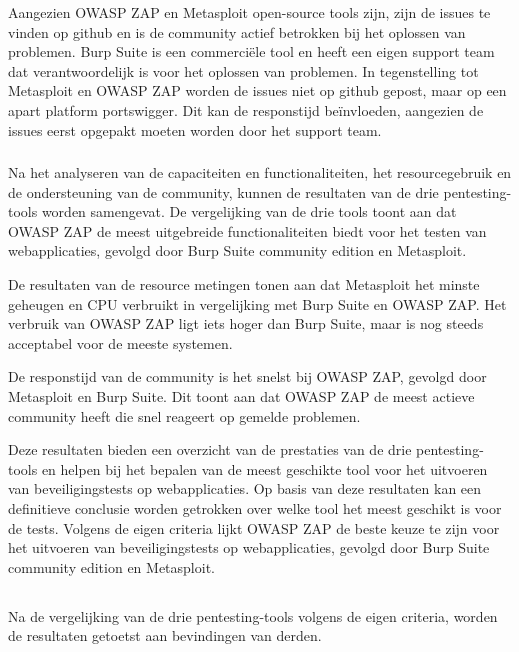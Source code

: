 Aangezien OWASP ZAP en Metasploit open-source tools zijn, zijn de issues te vinden op github en is de community actief
betrokken bij het oplossen van problemen. Burp Suite is een commerciële tool en heeft een eigen support team dat 
verantwoordelijk is voor het oplossen van problemen. In tegenstelling tot Metasploit en OWASP ZAP worden de issues niet 
op github gepost, maar op een apart platform portswigger. Dit kan de responstijd beïnvloeden, 
aangezien de issues eerst opgepakt moeten worden door het support team.

\subsubsection{}
Na het analyseren van de capaciteiten en functionaliteiten, het resourcegebruik en de ondersteuning van de community,
kunnen de resultaten van de drie pentesting-tools worden samengevat. De vergelijking van de drie tools toont aan dat
OWASP ZAP de meest uitgebreide functionaliteiten biedt voor het testen van webapplicaties, gevolgd door Burp Suite 
community edition en Metasploit. 

De resultaten van de resource metingen tonen aan dat Metasploit het minste 
geheugen en CPU verbruikt in vergelijking met Burp Suite en OWASP ZAP. Het verbruik van OWASP ZAP ligt iets hoger dan 
Burp Suite, maar is nog steeds acceptabel voor de meeste systemen. 

De responstijd van de community is het snelst bij OWASP ZAP, 
gevolgd door Metasploit en Burp Suite. Dit toont aan dat OWASP ZAP de meest actieve community heeft die snel reageert op 
gemelde problemen.

Deze resultaten bieden een overzicht van de prestaties van de drie pentesting-tools en helpen bij het bepalen van de 
meest geschikte tool voor het uitvoeren van beveiligingstests op webapplicaties. Op basis van deze resultaten kan een 
definitieve conclusie worden getrokken over welke tool het meest geschikt is voor de tests. Volgens de eigen criteria 
lijkt OWASP ZAP de beste keuze te zijn voor het uitvoeren van beveiligingstests op webapplicaties, gevolgd door Burp Suite 
community edition en Metasploit. 

\subsection{}
Na de vergelijking van de drie pentesting-tools volgens de eigen criteria, worden de resultaten getoetst aan bevindingen van 
derden.


